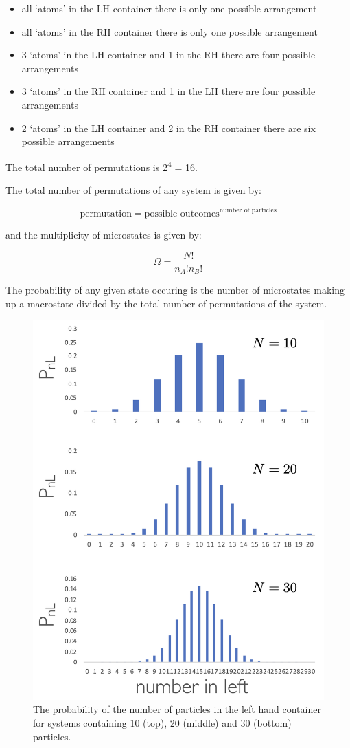 \documentclass[
]{book}
\providecommand{\tightlist}{%
  \setlength{\itemsep}{0pt}\setlength{\parskip}{0pt}}
\begin{document}
\begin{itemize}
\tightlist
\item
  all `atoms' in the LH container there is only one possible arrangement
\item
  all `atoms' in the RH container there is only one possible arrangement
\item
  3 `atoms' in the LH container and 1 in the RH there are four possible arrangements
\item
  3 `atoms' in the RH container and 1 in the LH there are four possible arrangements
\item
  2 `atoms' in the LH container and 2 in the RH container there are six possible arrangements
\end{itemize}

The total number of permutations is 2\textsuperscript{4} = 16.

The total number of permutations of any system is given by:

\begin{equation}
\textrm{permutation}=\textrm{possible outcomes}^\textrm{number of particles}
\label{eq:permutations}
\end{equation}

and the multiplicity of microstates is given by:

\begin{equation}
\Omega = \frac{N!}{n_A!n_B!}
\label{eq:multiplicity}
\end{equation}

The probability of any given state occuring is the number of microstates making up a macrostate divided by the total number of permutations of the system.

\begin{figure}

{\centering \includegraphics[width=0.5\linewidth]{images/probabilityleft} 

}

\caption{The probability of the number of particles in the left hand container for systems containing 10 (top), 20 (middle) and 30 (bottom) particles.}\label{fig:probabilityleft}
\end{figure}
\end{document}
